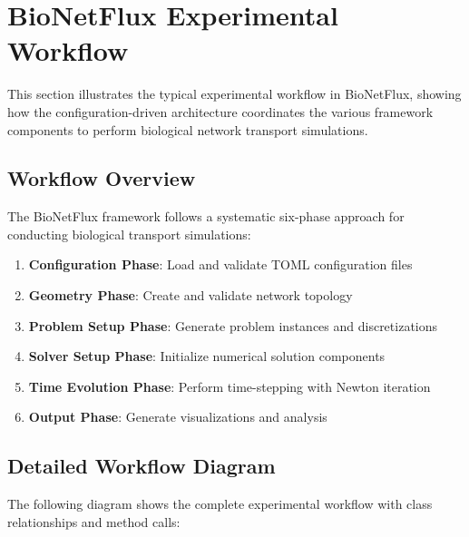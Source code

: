 
\section{BioNetFlux Experimental Workflow}
\label{sec:bionetflux_workflow}

This section illustrates the typical experimental workflow in BioNetFlux, showing how the configuration-driven architecture coordinates the various framework components to perform biological network transport simulations.

\subsection{Workflow Overview}

The BioNetFlux framework follows a systematic six-phase approach for conducting biological transport simulations:

\begin{enumerate}
    \item \textbf{Configuration Phase}: Load and validate TOML configuration files
    \item \textbf{Geometry Phase}: Create and validate network topology
    \item \textbf{Problem Setup Phase}: Generate problem instances and discretizations
    \item \textbf{Solver Setup Phase}: Initialize numerical solution components
    \item \textbf{Time Evolution Phase}: Perform time-stepping with Newton iteration
    \item \textbf{Output Phase}: Generate visualizations and analysis
\end{enumerate}

\subsection{Detailed Workflow Diagram}

The following diagram shows the complete experimental workflow with class relationships and method calls:

